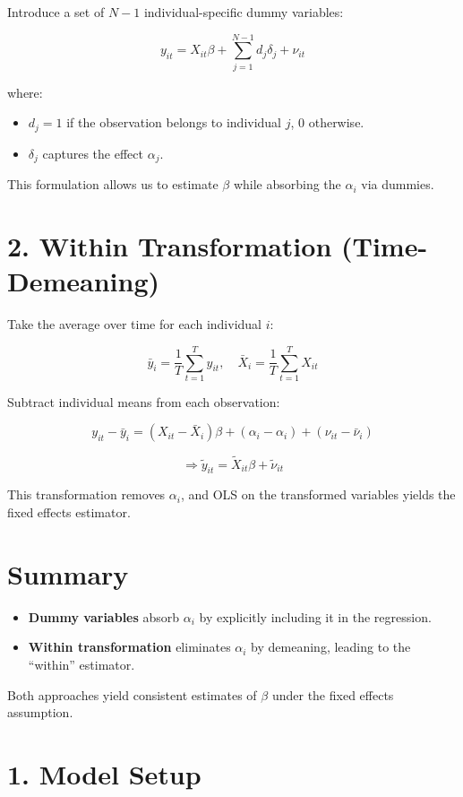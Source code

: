 \documentclass[12pt, oneside]{article}
\begin{document}
Introduce a set of \( N-1 \) individual-specific dummy variables:

\[
y_{it} = X_{it} \beta + \sum_{j=1}^{N-1} d_j \delta_j + \nu_{it}
\]

where:
\begin{itemize}
  \item \( d_j = 1 \) if the observation belongs to individual \( j \), 0 otherwise.
  \item \( \delta_j \) captures the effect \( \alpha_j \).
\end{itemize}

This formulation allows us to estimate \( \beta \) while absorbing the \( \alpha_i \) via dummies.

\section*{2. Within Transformation (Time-Demeaning)}

Take the average over time for each individual \( i \):

\[
\bar{y}_i = \frac{1}{T} \sum_{t=1}^T y_{it}, \quad
\bar{X}_i = \frac{1}{T} \sum_{t=1}^T X_{it}
\]

Subtract individual means from each observation:

\[
y_{it} - \bar{y}_i = (X_{it} - \bar{X}_i) \beta + (\alpha_i - \alpha_i) + (\nu_{it} - \bar{\nu}_i)
\]

\[
\Rightarrow \tilde{y}_{it} = \tilde{X}_{it} \beta + \tilde{\nu}_{it}
\]

This transformation removes \( \alpha_i \), and OLS on the transformed variables yields the fixed effects estimator.

\section*{Summary}

\begin{itemize}
  \item \textbf{Dummy variables} absorb \( \alpha_i \) by explicitly including it in the regression.
  \item \textbf{Within transformation} eliminates \( \alpha_i \) by demeaning, leading to the ``within'' estimator.
\end{itemize}

Both approaches yield consistent estimates of \( \beta \) under the fixed effects assumption.

\section*{1. Model Setup}
\end{document}
